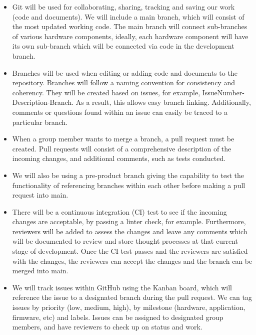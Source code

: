 \documentclass{article}
\begin{document}
\begin{itemize}
	\item Git will be used for collaborating, sharing, tracking and saving our work (code and documents). We will include a main branch, which will consist of the most updated working code. The main branch will connect sub-branches of various hardware components, ideally, each hardware component will have its own sub-branch which will be connected via code in the development branch.
	
	\item Branches will be used when editing or adding code and documents to the repository. Branches will follow a naming convention for consistency and coherency. They will be created based on issues, for example, IssueNumber-Description-Branch. As a result, this allows easy branch linking. Additionally, comments or questions found within an issue can easily be traced to a particular branch. 
	
	\item When a group member wants to merge a branch, a pull request must be created. Pull requests will consist of a comprehensive description of the incoming changes, and additional comments, such as tests conducted. 
	
	\item We will also be using a pre-product branch giving the capability to test the functionality of referencing branches within each other before making a pull request into main.
	
	\item There will be a continuous integration (CI) test to see if the incoming changes are acceptable, by passing a linter check, for example. Furthermore, reviewers will be added to assess the changes and leave any comments which will be documented to review and store thought processes at that current stage of development. Once the CI test passes and the reviewers are satisfied with the changes, the reviewers can accept the changes and the branch can be merged into main. 
	
	\item We will track issues within GitHub using the Kanban board, which will reference the issue to a designated branch during the pull request. We can tag issues by priority (low, medium, high), by milestone (hardware, application, firmware, etc) and labels. Issues can be assigned to designated group members, and have reviewers to check up on status and work. 

\end{itemize}
\end{document}
